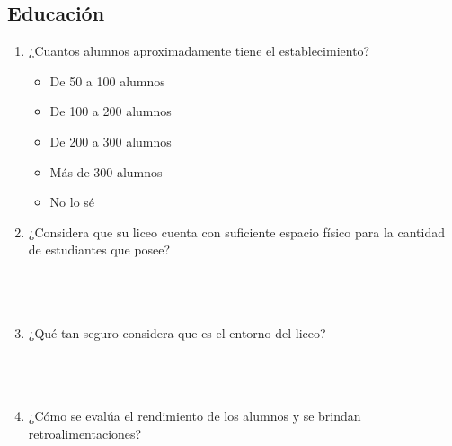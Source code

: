 \documentclass{article}
\begin{document}
\subsection*{Educación}
\begin{enumerate}
    \item ¿Cuantos alumnos aproximadamente tiene el establecimiento? 
        \begin{itemize}[label=$\square$]
            \item De 50 a 100 alumnos
            \item De 100 a 200 alumnos
            \item De 200 a 300 alumnos
            \item Más de 300 alumnos
            \item No lo sé
        \end{itemize}
    \item ¿Considera que su liceo cuenta con suficiente espacio físico para la cantidad de estudiantes que posee? \\[0.5cm]
        \underline{\hspace{0.95\linewidth}} \vspace{0.3cm} \\
        \underline{\hspace{0.95\linewidth}} \vspace{0.3cm} \\
        \underline{\hspace{0.95\linewidth}} \vspace{0.3cm} \\
    \item ¿Qué tan seguro considera que es el entorno del liceo? \\[0.5cm]
        \underline{\hspace{0.95\linewidth}} \vspace{0.3cm} \\
        \underline{\hspace{0.95\linewidth}} \vspace{0.3cm} \\
        \underline{\hspace{0.95\linewidth}} \vspace{0.3cm} \\
    \item ¿Cómo se evalúa el rendimiento de los alumnos y se brindan retroalimentaciones? \\[0.5cm]
        \underline{\hspace{0.95\linewidth}} \vspace{0.3cm} \\

\end{enumerate}
\end{document}
